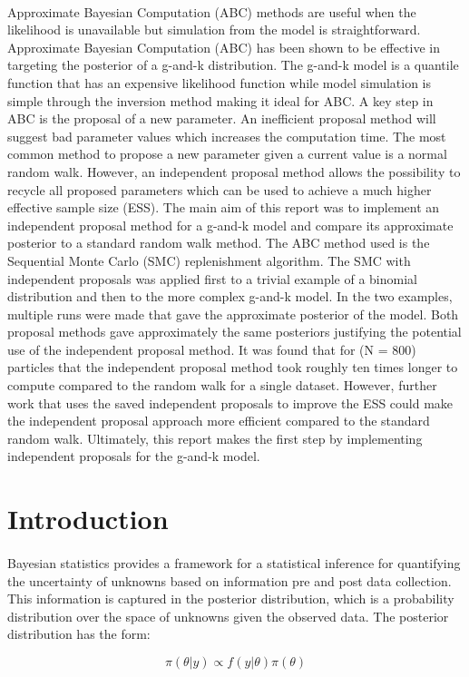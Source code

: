 \documentclass[12,fleqn]{article}
\theoremstyle{definition}
\theoremstyle{plain}
\begin{document}
\begin{titlepage}
\paragraph{}
Approximate Bayesian Computation (ABC) methods are useful when the likelihood is unavailable but simulation from the model is straightforward. Approximate Bayesian Computation (ABC) has been shown to be effective in targeting the posterior of a g-and-k distribution. The g-and-k model is a quantile function that has an expensive likelihood function while model simulation is simple through the inversion method making it ideal for ABC. A key step in ABC is the proposal of a new parameter. An inefficient proposal method will suggest bad parameter values which increases the computation time.  The most common method to propose a new parameter given a current value is a normal random walk. However, an independent proposal method allows the possibility to recycle all proposed parameters which can be used to achieve a much higher effective sample size (ESS). The main aim of this report was to implement an independent proposal method for a g-and-k model and compare its approximate posterior to a standard random walk method. The ABC method used is the Sequential Monte Carlo (SMC) replenishment algorithm. The SMC with independent proposals was applied first to a trivial example of a binomial distribution and then to the more complex g-and-k model. In the two examples, multiple runs were made that gave the approximate posterior of the model. Both proposal methods gave approximately the same posteriors justifying the potential use of the independent proposal method. It was found that for (N = 800) particles that the independent proposal method took roughly ten times longer to compute compared to the random walk for a single dataset. However, further work that uses the saved independent proposals to improve the ESS could make the independent proposal approach more efficient compared to the standard random walk. Ultimately, this report makes the first step by implementing independent proposals for the g-and-k model.
\par
\end{titlepage}


\tableofcontents

\section{Introduction}
\paragraph{}
Bayesian statistics provides a framework for a statistical inference for quantifying the uncertainty of unknowns based on information pre and post data collection. This information is captured in the posterior distribution, which is a probability distribution over the space of unknowns given the observed data. The posterior distribution has the form:
\par
\begin{equation*}
\pi(\theta|y) \propto f(y|\theta)\pi(\theta)
\end{equation*}
\end{document}
